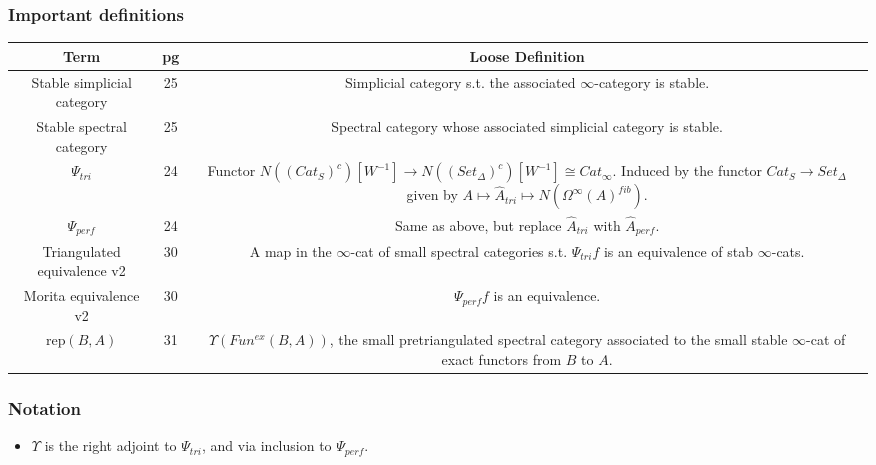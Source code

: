 \documentclass[letterpaper]{article}
\theoremstyle{definition}
\begin{document}
\subsubsection{Important definitions}
\begin{tabulary}{0.7\textwidth}{|C|C|C|}
\hline
Term & pg & Loose Definition\\
\hline
\hline
Stable simplicial category & 25 & Simplicial category s.t. the
                                  associated $\infty$-category is
                                  stable.\\
\hline
Stable spectral category & 25 & Spectral category whose associated
                                simplicial category is stable.\\
\hline
$\Psi_{tri}$ & 24 & Functor $N((Cat_S)^c)[W^{-1}] \rightarrow
                    N((Set_{\Delta})^c)[W^{-1}] \cong Cat_{\infty}$. 
                     Induced by the functor $Cat_S \rightarrow
                    Set_{\Delta}$ given by $A \mapsto \widehat A_{tri}
                    \mapsto N(\Omega^\infty(A)^{fib})$.\\
\hline
$\Psi_{perf}$ & 24 & Same as above, but replace $\widehat A_{tri}$
                     with $\widehat A_{perf}$.\\
\hline
Triangulated equivalence v2 & 30 & A map in the $\infty$-cat of small
                                   spectral categories
                                   s.t. $\Psi_{tri}f$ is an
                                   equivalence of stab $\infty$-cats.\\
\hline
Morita equivalence v2 & 30 & $\Psi_{perf}f$ is an equivalence.\\
\hline
rep$(B,A)$ & 31 & $\Upsilon(Fun^{ex}(B,A))$, the small pretriangulated
  spectral category associated to the small stable $\infty$-cat of
  exact functors from $B$ to $A$.\\
\hline
\end{tabulary}
\subsubsection{Notation}
\begin{itemize}
\item $\Upsilon$ is the right adjoint to $\Psi_{tri}$, and via
  inclusion to $\Psi_{perf}$.
\end{itemize}
\end{document}
